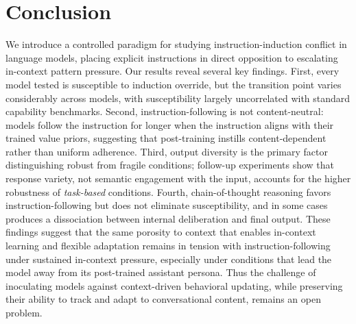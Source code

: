 \documentclass{article} %
\begin{document}
\section{Conclusion}
\label{sec:conclusion}

We introduce a controlled paradigm for studying instruction-induction conflict in language models, placing explicit instructions in direct opposition to escalating in-context pattern pressure. Our results reveal several key findings. First, every model tested is susceptible to induction override, but the transition point varies considerably across models, with susceptibility largely uncorrelated with standard capability benchmarks. Second, instruction-following is not content-neutral: models follow the instruction for longer when the instruction aligns with their trained value priors, suggesting that post-training instills content-dependent rather than uniform adherence. Third, output diversity is the primary factor distinguishing robust from fragile conditions; follow-up experiments show that response variety, not semantic engagement with the input, accounts for the higher robustness of \emph{task-based} conditions. Fourth, chain-of-thought reasoning favors instruction-following but does not eliminate susceptibility, and in some cases produces a dissociation between internal deliberation and final output. These findings suggest that the same porosity to context that enables in-context learning and flexible adaptation remains in tension with instruction-following under sustained in-context pressure, especially under conditions that lead the model away from its post-trained assistant persona. Thus the challenge of inoculating models against context-driven behavioral updating, while preserving their ability to track and adapt to conversational content, remains an open problem.





\end{document}
